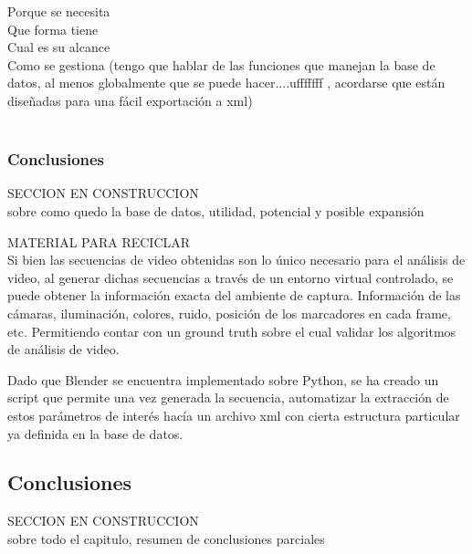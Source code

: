 Porque se necesita\\
Que forma tiene\\
Cual es su alcance\\
Como se gestiona (tengo que hablar de las funciones que manejan la base de datos, al menos globalmente que se puede hacer....ufffffff
, acordarse que están diseñadas para una fácil exportación a xml)\\
\\
\subsubsection{Conclusiones} SECCION EN CONSTRUCCION\\
sobre como quedo la base de datos, utilidad, potencial y posible expansión




MATERIAL PARA RECICLAR\\


Si bien las secuencias de video obtenidas son lo único necesario para el análisis de video, al generar dichas secuencias a través de un entorno virtual controlado, se puede obtener la información exacta del ambiente de captura. Información de las cámaras, iluminación, colores, ruido, posición de los marcadores en cada frame, etc. Permitiendo contar con un ground truth sobre el cual validar los algoritmos de análisis de video. 

Dado que Blender se encuentra implementado sobre Python, se ha creado un script que permite una vez generada la secuencia, automatizar la extracción de estos parámetros de interés hacía un archivo xml con cierta estructura particular ya definida en la base de datos. 
 


\subsection{Conclusiones} SECCION EN CONSTRUCCION\\
sobre todo el capitulo, resumen de conclusiones parciales


